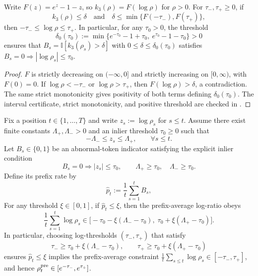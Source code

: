 \begin{lemma}
\label{lem:k3-inlier-certificate}
Write $F(z)=e^z-1-z$, so $k_3(\rho)=F(\log\rho)$ for $\rho>0$.
For $\tau_-,\tau_+\ge0$, if
\begin{equation*}
    k_3(\rho)\le\delta
    \quad\text{and}\quad
    \delta\le\min\{F(-\tau_-),F(\tau_+)\},
\end{equation*}
then $-\tau_-\le\log\rho\le\tau_+$.
In particular, for any $\tau_0>0$, the threshold
\begin{equation*}
    \delta_0(\tau_0):=\min\{e^{-\tau_0}-1+\tau_0,\ e^{\tau_0}-1-\tau_0\}>0
\end{equation*}
ensures that $B_s=\mathbb I[k_3(\rho_s)>\delta]$ with
$0\le\delta\le\delta_0(\tau_0)$ satisfies
$B_s=0\Rightarrow|\log\rho_s|\le\tau_0$.
\end{lemma}
\begin{proof}
$F$ is strictly decreasing on $(-\infty,0]$ and strictly increasing on $[0,\infty)$,
with $F(0)=0$. If $\log\rho<-\tau_-$ or $\log\rho>\tau_+$,
then $F(\log\rho)>\delta$, a contradiction. The same strict monotonicity
gives positivity of both terms defining $\delta_0(\tau_0)$.
The interval certificate, strict monotonicity, and positive threshold are checked
in .
\end{proof}

\begin{lemma}
\label{lem:anom-rate-implies-pre}
Fix a position $t\in\{1,\ldots,T\}$ and write $z_s := \log\rho_s$ for $s\le t$. Assume there exist finite constants
$\Lambda_+,\Lambda_->0$ and an inlier threshold $\tau_0\ge 0$ such that
\begin{equation*}
    -\Lambda_- \le z_s \le \Lambda_+,
    \qquad
    \forall s\le t.
\end{equation*}
Let $B_s\in\{0,1\}$ be an abnormal-token indicator satisfying the explicit inlier condition
\begin{equation*}
    B_s=0 \Longrightarrow |z_s|\le \tau_0,
    \qquad
    \Lambda_+\ge\tau_0,\quad \Lambda_-\ge\tau_0.
\end{equation*}
Define its prefix rate by
\begin{equation*}
    \widehat{p}_t := \frac{1}{t}\sum_{s=1}^{t} B_s,
\end{equation*}
For any threshold $\xi\in[0,1]$, if $\widehat{p}_t \le \xi$, then the prefix-average log-ratio obeys
\begin{equation*}
    \frac{1}{t}\sum_{s=1}^{t} \log\rho_s
    \in
    \Big[-\tau_0 - \xi(\Lambda_- - \tau_0),\;\tau_0 + \xi(\Lambda_+ - \tau_0)\Big].
\end{equation*}
In particular, choosing log-thresholds $(\tau_-,\tau_+)$ that satisfy
\begin{equation*}
    \tau_- \ge \tau_0 + \xi(\Lambda_- - \tau_0),
    \qquad
    \tau_+ \ge \tau_0 + \xi(\Lambda_+ - \tau_0)
\end{equation*}
ensures $\widehat{p}_t\le\xi$ implies the prefix-average constraint $\frac{1}{t}\sum_{s\le t}\log\rho_s\in[-\tau_-,\tau_+]$, and hence
$\rho_{t}^{\mathrm{pre}}\in [e^{-\tau_-}, e^{\tau_+}]$.
\end{lemma}

